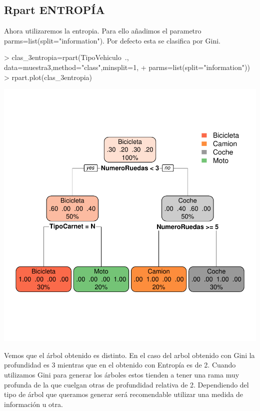 \documentclass [a4paper] {article}
\begin{document}
\subsection{Rpart ENTROPÍA}
Ahora utilizaremos la entropia. 
Para ello añadimos el parametro parms=list(split="information").
Por defecto esta se clasifica por Gini.
\begin{center}
\begin{Schunk}
\begin{Sinput}
> clas_3entropia=rpart(TipoVehiculo~., data=muestra3,method="class",minsplit=1,
+                       parms=list(split="information"))
> rpart.plot(clas_3entropia)
\end{Sinput}
\end{Schunk}
\includegraphics{entrega-rpart3_entropia}
\end{center}

Vemos que el árbol obtenido es distinto.
En el caso del arbol obtenido con Gini la profundidad es 3 mientras que en el obtenido con Entropía es de 2.
Cuando utilizamos Gini para generar los árboles estos tienden a tener una rama muy profunda de la que cuelgan otras de profundidad relativa de 2.
Dependiendo del tipo de árbol que queramos generar será recomendable utilizar una medida de información u otra.

\newpage
\end{document}
